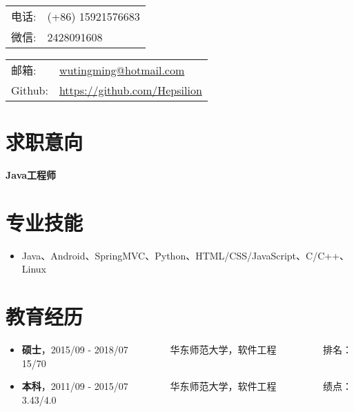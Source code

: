 \documentclass[letterpaper, UTF8, 11pt]{article}
\def\name{\textbf{\textcolor[rgb]{0.00, 0.00, 0.00}{\fontsize{30pt}{30pt}吴庭明}} ~~~~~~~~~ \fontsize{15pt}{15pt}}
\begin{document}
	
	\noindent{\bf \name} 
	\vspace{0.1in}

	\begin{minipage}{0.45\linewidth}
		\begin{tabular}{ll}
			电话:   & (+86) 15921576683 \\
			微信:   & 2428091608 \\
		\end{tabular}
	\end{minipage}
	\begin{minipage}{0.45\linewidth}
		\begin{tabular}{ll}
			邮箱:   & \href{mailto:wutingming@hotmail.com}{ wutingming@hotmail.com} \\
			Github: & \href{https://github.com/Hepsilion}{https://github.com/Hepsilion}\\
		\end{tabular}
	\end{minipage}
	\vspace{-0.1in}
	
	\section*{\textbf{求职意向}}\vspace{-0.15in}
		\textbf{Java工程师}
	\vspace{-0.25in}
	
	\section*{\textbf{专业技能}}\vspace{-0.15in}
	\begin{itemize}
		\item Java、Android、SpringMVC、Python、HTML/CSS/JavaScript、C/C++、Linux
	\end{itemize}
	\vspace{-0.32in}
	
	\section*{\textbf{教育经历}}\vspace{-0.15in}
	\begin{itemize}
		\item \textbf{硕士}，2015/09 - 2018/07 ~~~~~~~~华东师范大学，软件工程  ~~~~~~~~~排名：15/70
		\item \textbf{本科}，2011/09 - 2015/07 ~~~~~~~~华东师范大学，软件工程  ~~~~~~~~~绩点：3.43/4.0
	\end{itemize}
	\vspace{-0.32in}
	
\end{document}
